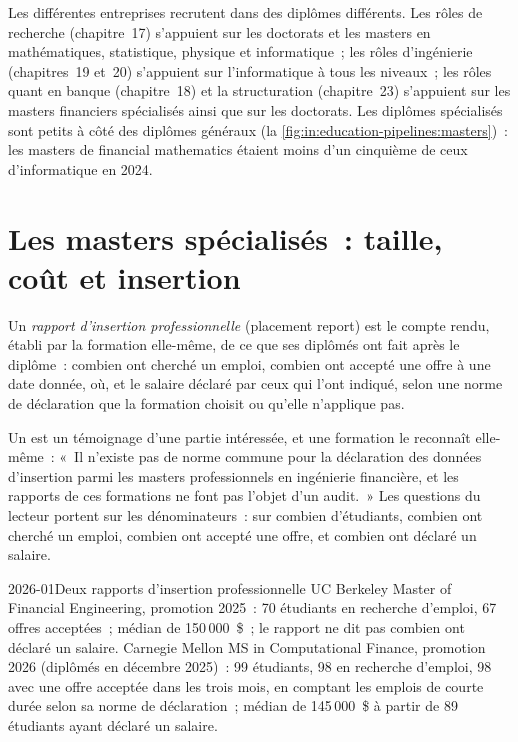 Les différentes entreprises recrutent dans des diplômes différents. Les rôles de recherche (chapitre~17) s'appuient sur les doctorats et les masters en
mathématiques, statistique, physique et informatique~; les rôles d'ingénierie (chapitres~19 et~20) s'appuient sur l'informatique à tous les
niveaux~; les rôles quant en banque (chapitre~18) et la structuration (chapitre~23) s'appuient sur les masters financiers spécialisés
ainsi que sur les doctorats. Les diplômes spécialisés sont petits à côté des diplômes généraux (la \cref{fig:in:education-pipelines:masters})~:
les masters de financial mathematics étaient moins d'un cinquième de ceux d'informatique en 2024.

\section{Les masters spécialisés~: taille, coût et insertion}

\begin{definition}\label{def:in:education-pipelines:placement}
Un \emph{rapport d'insertion professionnelle} (placement report) est le compte rendu, établi par la formation elle-même, de ce que ses diplômés ont fait après le
diplôme~: combien ont cherché un emploi, combien ont accepté une offre à une date donnée, où, et le salaire déclaré par ceux qui l'ont
indiqué, selon une norme de déclaration que la formation choisit ou qu'elle n'applique pas.
\end{definition}

Un  est un témoignage d'une partie intéressée, et une formation le reconnaît elle-même~: «~Il n'existe pas de norme commune pour la déclaration des données d'insertion
parmi les masters professionnels en ingénierie financière, et les rapports de ces formations ne font pas l'objet d'un audit.~» Les questions du lecteur portent sur les dénominateurs~: sur combien d'étudiants, combien
ont cherché un emploi, combien ont accepté une offre, et combien
ont déclaré un salaire.

\begin{dated}{2026-01}{Deux rapports d'insertion professionnelle}\label{dat:in:education-pipelines:placement}
UC Berkeley Master of Financial Engineering, promotion 2025~: 70 étudiants en recherche d'emploi, 67 offres acceptées~;  médian
de 150\,000~\$~; le rapport ne dit pas combien ont déclaré un salaire. Carnegie Mellon MS in Computational Finance, promotion
2026 (diplômés en décembre 2025)~: 99 étudiants, 98 en recherche d'emploi, 98 avec une offre acceptée dans les trois mois, en comptant
les emplois de courte durée selon sa norme de déclaration~;  médian de 145\,000~\$ à partir de 89 étudiants ayant déclaré un salaire.
\end{dated}

